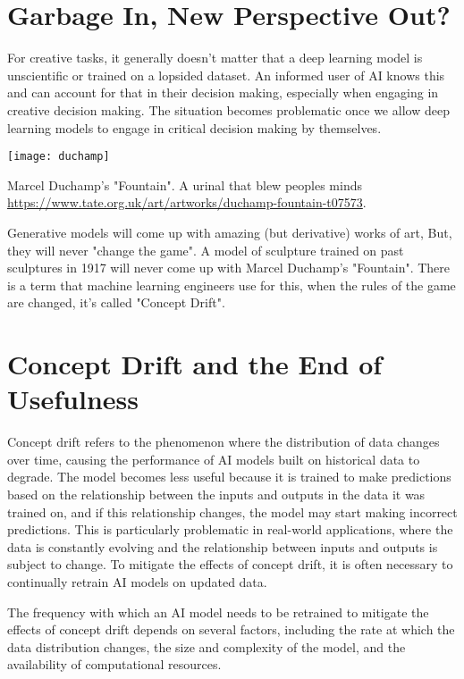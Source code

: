 \section{Garbage In, New Perspective Out?}

For creative tasks, it generally doesn't matter that a deep learning model is unscientific or trained on a lopsided dataset. An informed user of AI knows this and can account for that in their decision making, especially when engaging in creative decision making. The situation becomes problematic once we allow deep learning models to engage in critical decision making by themselves. 

\begin{marginfigure}[-5.5cm]
        \texttt{[image: duchamp]}
        \caption{Marcel Duchamp's "Fountain". A urinal that blew peoples minds \url{https://www.tate.org.uk/art/artworks/duchamp-fountain-t07573}.}
\end{marginfigure}

Generative models will come up with amazing (but derivative) works of art, But, they will never "change the game". A model of sculpture trained on past sculptures in 1917 will never come up with Marcel Duchamp's "Fountain". There is a term that machine learning engineers use for this, when the rules of the game are changed, it's called "Concept Drift".

\section{Concept Drift and the End of Usefulness}

Concept drift refers to the phenomenon where the distribution of data changes over time, causing the performance of AI models built on historical data to degrade. The model becomes less useful because it is trained to make predictions based on the relationship between the inputs and outputs in the data it was trained on, and if this relationship changes, the model may start making incorrect predictions. This is particularly problematic in real-world applications, where the data is constantly evolving and the relationship between inputs and outputs is subject to change. To mitigate the effects of concept drift, it is often necessary to continually retrain AI models on updated data.

The frequency with which an AI model needs to be retrained to mitigate the effects of concept drift depends on several factors, including the rate at which the data distribution changes, the size and complexity of the model, and the availability of computational resources.

